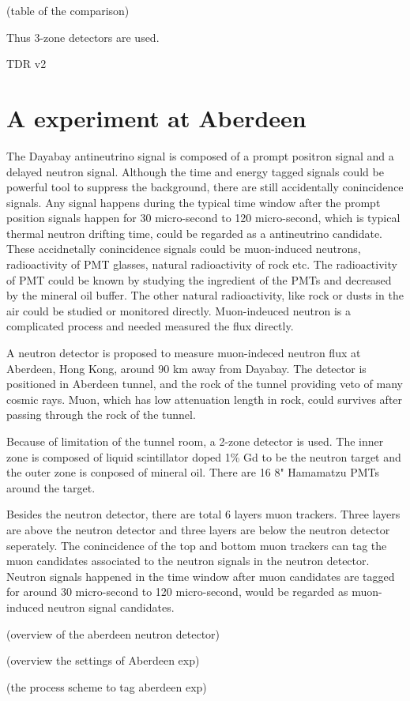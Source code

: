 (table of the comparison)

Thus 3-zone detectors are used.





TDR v2

\section{A experiment at Aberdeen}

The Dayabay antineutrino signal is composed of a prompt positron signal and a delayed
neutron signal. Although the time and energy tagged signals could be powerful tool to suppress
the background, there are still accidentally conincidence signals. Any signal happens during
the typical time window after the prompt position signals happen for 30 micro-second to 120 micro-second,
which is typical thermal neutron drifting time, 
could be regarded as a antineutrino candidate. These accidnetally conincidence signals could be
muon-induced neutrons, radioactivity of PMT glasses, natural radioactivity of rock etc.
The radioactivity of PMT could be known by studying the ingredient of the PMTs and decreased
by the mineral oil buffer. The other natural radioactivity, like rock or dusts in the 
air could be studied or monitored directly. Muon-indeuced neutron is a complicated
process and needed measured the flux directly.

A neutron detector is proposed to measure muon-indeced neutron flux at Aberdeen, Hong Kong,
around 90 km away from Dayabay. The detector is positioned in Aberdeen tunnel, and the rock of the tunnel
providing veto of many cosmic rays. Muon, which has low attenuation length in rock, could
survives after passing through the rock of the tunnel.

Because of limitation of the tunnel room, a 2-zone detector is used. The inner zone
is composed of liquid scintillator doped 1\% Gd to be the neutron target and 
the outer zone is conposed of mineral oil. There are 16 8" Hamamatzu PMTs around the target.


Besides the neutron detector, there are total 6 layers muon trackers. Three layers
are above the neutron detector and three layers are below the neutron detector seperately.
The conincidence of the top and bottom muon trackers can tag the muon candidates
associated to the neutron signals in the neutron detector. Neutron signals happened
in the time window after muon candidates are tagged for around 30 micro-second to
120 micro-second, would be regarded as muon-induced neutron signal candidates.


(overview of the aberdeen neutron detector)


(overview the settings of Aberdeen exp)

(the process scheme to tag aberdeen exp)
